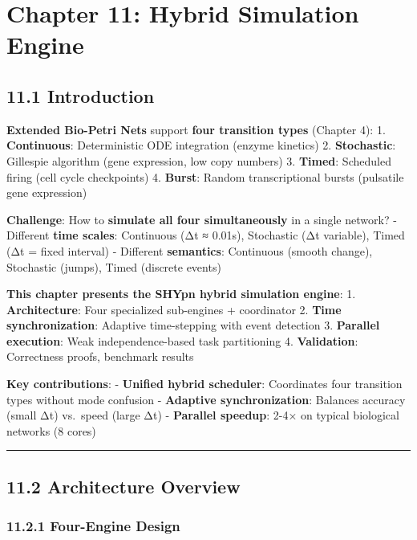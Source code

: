 \hypertarget{chapter-11-hybrid-simulation-engine}{%
\chapter{Chapter 11: Hybrid Simulation
Engine}\label{chapter-11-hybrid-simulation-engine}}

\hypertarget{introduction}{%
\section{11.1 Introduction}\label{introduction}}

\textbf{Extended Bio-Petri Nets} support \textbf{four transition types}
(Chapter 4): 1. \textbf{Continuous}: Deterministic ODE integration
(enzyme kinetics) 2. \textbf{Stochastic}: Gillespie algorithm (gene
expression, low copy numbers) 3. \textbf{Timed}: Scheduled firing (cell
cycle checkpoints) 4. \textbf{Burst}: Random transcriptional bursts
(pulsatile gene expression)

\textbf{Challenge}: How to \textbf{simulate all four simultaneously} in
a single network? - Different \textbf{time scales}: Continuous (Δt ≈
0.01s), Stochastic (Δt variable), Timed (Δt = fixed interval) -
Different \textbf{semantics}: Continuous (smooth change), Stochastic
(jumps), Timed (discrete events)

\textbf{This chapter presents the SHYpn hybrid simulation engine}: 1.
\textbf{Architecture}: Four specialized sub-engines + coordinator 2.
\textbf{Time synchronization}: Adaptive time-stepping with event
detection 3. \textbf{Parallel execution}: Weak independence-based task
partitioning 4. \textbf{Validation}: Correctness proofs, benchmark
results

\textbf{Key contributions}: - \textbf{Unified hybrid scheduler}:
Coordinates four transition types without mode confusion -
\textbf{Adaptive synchronization}: Balances accuracy (small Δt)
vs.~speed (large Δt) - \textbf{Parallel speedup}: 2-4× on typical
biological networks (8 cores)

\begin{center}\rule{0.5\linewidth}{0.5pt}\end{center}

\hypertarget{architecture-overview}{%
\section{11.2 Architecture Overview}\label{architecture-overview}}

\hypertarget{four-engine-design}{%
\subsection{11.2.1 Four-Engine Design}\label{four-engine-design}}

